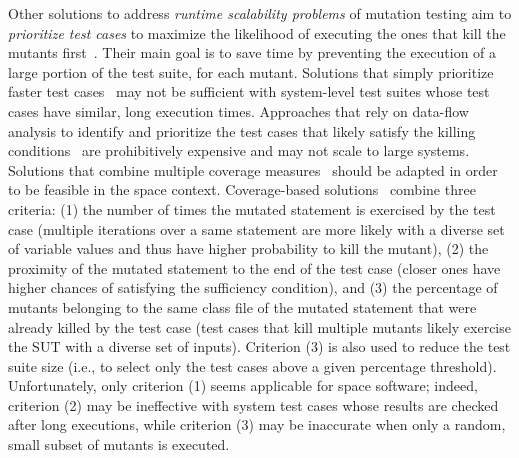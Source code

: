 Other solutions to address \emph{runtime scalability problems} of mutation testing  aim to \emph{prioritize test cases} to maximize the likelihood of executing the ones that kill the mutants first~\cite{just2012using,papadakis2011automatically,zhang2013faster}. Their main goal is to save time by preventing the execution of a large portion of the test suite, for each mutant.
Solutions that simply prioritize faster test cases~\cite{just2012using}
 may not be sufficient with system-level test suites whose test cases have similar, long execution times.
Approaches that rely on data-flow analysis to identify and prioritize the test cases that likely satisfy the killing conditions~\cite{papadakis2011automatically} are prohibitively expensive and may not scale to large systems.
Solutions that combine multiple coverage measures~\cite{zhang2013faster} should be adapted in order 
to be feasible in the space context.
Coverage-based solutions~\cite{zhang2013faster} combine three criteria: (1) the number of times the mutated statement is exercised by the test case (multiple iterations over a same statement are more likely with a diverse set of variable values and thus have higher probability to kill the mutant), (2) the proximity of the mutated statement to the end of the test case (closer ones have higher chances of satisfying the sufficiency condition), and (3) the percentage of mutants belonging to the same class file of the mutated statement that were already killed by the test case (test cases that kill multiple mutants likely exercise the SUT with a diverse set of inputs). 
Criterion (3) is also used to reduce the test suite size (i.e., to select only the test cases above a given percentage threshold). 
Unfortunately, only criterion (1) seems applicable for space software; indeed, criterion (2) may be ineffective with system test cases whose results are checked after long executions, while criterion (3) may be inaccurate when only a random, small subset of mutants is executed. 






%
%
%




